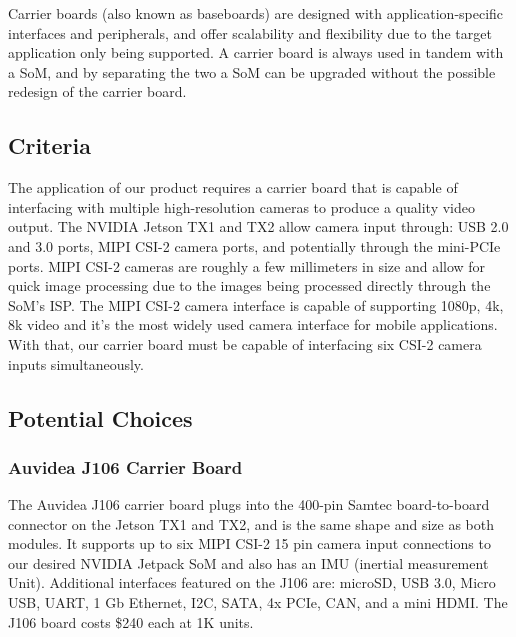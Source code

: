 \documentclass[letterpaper,10pt,serif,draftclsnofoot,onecolumn,compsoc,titlepage]{IEEEtran}
\begin{document}
Carrier boards (also known as baseboards) are designed with application-specific 
interfaces and peripherals, and offer scalability and flexibility due to the target 
application only being supported. A carrier board is always used in tandem with a SoM, 
and by separating the two a SoM can be upgraded without the possible redesign of the 
carrier board\cite{ToradexSBC, ArrowCB, ToradexCBQ}.\\

\subsection{Criteria}

The application of our product requires a carrier board that is capable of interfacing 
with multiple high-resolution cameras to produce a quality video output. The NVIDIA Jetson TX1 
and TX2 allow camera input through: USB 2.0 and 3.0 ports, MIPI CSI-2 camera ports, and 
potentially through the mini-PCIe ports\cite{JetsonCams}. MIPI CSI-2 cameras are roughly a few millimeters 
in size and allow for quick image processing due to the images being processed directly 
through the SoM's ISP. The MIPI CSI-2 camera interface is capable of supporting 1080p, 
4k, 8k video and it's the most widely used camera interface for mobile 
applications\cite{MIPIOverview}. With that, our carrier board must be capable of interfacing  
six CSI-2 camera inputs simultaneously. \\

\subsection{Potential Choices}

\subsubsection{Auvidea J106 Carrier Board}

The Auvidea J106 carrier board plugs into the 400-pin Samtec board-to-board connector 
on the Jetson TX1 and TX2, and is the same shape and size as both modules. 
It supports up to six MIPI CSI-2 15 pin camera input connections to our 
desired NVIDIA Jetpack SoM and also has an IMU (inertial measurement Unit). Additional 
interfaces featured on the J106 are: microSD, USB 
3.0, Micro USB, UART, 1 Gb Ethernet, I2C, SATA, 4x PCIe, CAN, and a mini 
HDMI\cite{AuvideaJ106}. The J106 board costs \$240 each at 1K units\cite{AuvideaQuote}.\\
\end{document}

